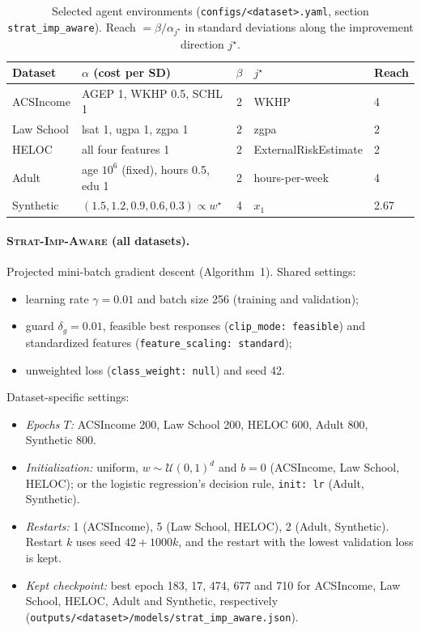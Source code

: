 \begin{table}[h]
\centering
\caption{Selected agent environments (\texttt{configs/<dataset>.yaml}, section \texttt{strat\_imp\_aware}). Reach $=\beta/\alpha_{j^\star}$ in standard deviations along the improvement direction $j^\star$.}
\label{tab:env}
\small
\begin{tabular}{llcll}
\toprule
Dataset & $\alpha$ (cost per SD) & $\beta$ & $j^\star$ & Reach \\
\midrule
ACSIncome  & AGEP 1, WKHP 0.5, SCHL 1                 & 2 & WKHP & 4 \\
Law School & lsat 1, ugpa 1, zgpa 1                    & 2 & zgpa & 2 \\
HELOC      & all four features 1                       & 2 & ExternalRiskEstimate & 2 \\
Adult      & age $10^{6}$ (fixed), hours 0.5, edu 1    & 2 & hours-per-week & 4 \\
Synthetic  & $(1.5,1.2,0.9,0.6,0.3)\propto w^\star$    & 4 & $x_1$ & 2.67 \\
\bottomrule
\end{tabular}
\end{table}

\paragraph{\textsc{Strat-Imp-Aware} (all datasets).}
Projected mini-batch gradient descent (Algorithm~1). Shared settings:
\begin{itemize}
  \item learning rate $\gamma=0.01$ and batch size 256 (training and validation);
  \item guard $\delta_g=0.01$, feasible best responses
        (\texttt{clip\_mode: feasible}) and standardized features
        (\texttt{feature\_scaling: standard});
  \item unweighted loss (\texttt{class\_weight: null}) and seed 42.
\end{itemize}
Dataset-specific settings:
\begin{itemize}
  \item \emph{Epochs $T$:} ACSIncome 200, Law School 200, HELOC 600, Adult 800,
        Synthetic 800.
  \item \emph{Initialization:} uniform, $w\sim\mathcal{U}(0,1)^d$ and $b=0$
        (ACSIncome, Law School, HELOC); or the logistic regression's decision
        rule, \texttt{init: lr} (Adult, Synthetic).
  \item \emph{Restarts:} 1 (ACSIncome), 5 (Law School, HELOC), 2 (Adult,
        Synthetic). Restart $k$ uses seed $42+1000k$, and the restart with the
        lowest validation loss is kept.
  \item \emph{Kept checkpoint:} best epoch 183, 17, 474, 677 and 710 for
        ACSIncome, Law School, HELOC, Adult and Synthetic, respectively
        (\texttt{outputs/<dataset>/models/strat\_imp\_aware.json}).
\end{itemize}

